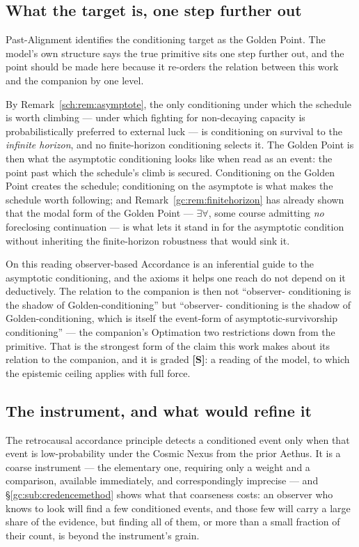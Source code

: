 \documentclass[11pt]{article}
\numberwithin{equation}{section}
\theoremstyle{plain}
\theoremstyle{definition}
\theoremstyle{remark}
\begin{document}
\subsection{What the target is, one step further out}\label{ra:sub:asymptote}

Past-Alignment identifies the conditioning target as the Golden Point.
The model's own structure says the true primitive sits one step further
out, and the point should be made here because it re-orders the relation
between this work and the companion by one level.

By Remark~\ref{sch:rem:asymptote}, the only conditioning under which the
schedule is worth climbing --- under which fighting for non-decaying
capacity is probabilistically preferred to external luck --- is
conditioning on survival to the \emph{infinite horizon}, and no
finite-horizon conditioning selects it. The Golden Point is then what
the asymptotic conditioning looks like when read as an event: the point
past which the schedule's climb is secured. Conditioning on the Golden
Point creates the schedule; conditioning on the asymptote is what makes
the schedule worth following; and Remark~\ref{gc:rem:finitehorizon} has
already shown that the modal form of the Golden Point --- $\exists\forall$,
some course admitting \emph{no} foreclosing continuation --- is what lets
it stand in for the asymptotic condition without inheriting the
finite-horizon robustness that would sink it.

On this reading observer-based Accordance is an inferential guide to the
asymptotic conditioning, and the axioms it helps one reach do not depend
on it deductively. The relation to the companion is then not ``observer-
conditioning is the shadow of Golden-conditioning'' but ``observer-
conditioning is the shadow of Golden-conditioning, which is itself the
event-form of asymptotic-survivorship conditioning'' --- the companion's
Optimation two restrictions down from the primitive. That is the
strongest form of the claim this work makes about its relation to the
companion, and it is graded \textbf{[S]}: a reading of the model, to
which the epistemic ceiling applies with full force.

\subsection{The instrument, and what would refine it}\label{ra:sub:instrument}

The retrocausal accordance principle detects a conditioned event only
when that event is low-probability under the Cosmic Nexus from the prior
Aethus. It is a coarse instrument --- the elementary one, requiring only
a weight and a comparison, available immediately, and correspondingly
imprecise --- and \S\ref{gc:sub:credencemethod} shows what that
coarseness costs: an observer who knows to look will find a few
conditioned events, and those few will carry a large share of the
evidence, but finding all of them, or more than a small fraction of
their count, is beyond the instrument's grain.
\end{document}
